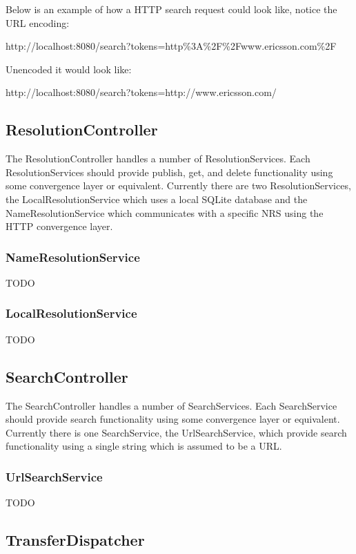Below is an example of how a HTTP search request could look like, notice the URL encoding:

http://localhost:8080/search?tokens=http\%3A\%2F\%2Fwww.ericsson.com\%2F

Unencoded it would look like:

http://localhost:8080/search?tokens=http://www.ericsson.com/

\subsection{ResolutionController}
\label{sec:ResolutionController}

The ResolutionController handles a number of ResolutionServices. Each ResolutionServices should provide publish, get, and delete functionality using some convergence layer or equivalent. Currently there are two ResolutionServices, the LocalResolutionService which uses a local SQLite database and the NameResolutionService which communicates with a specific NRS using the HTTP convergence layer.

\subsubsection{NameResolutionService}

TODO

\subsubsection{LocalResolutionService}

TODO

\subsection{SearchController}
\label{sec:SearchController}

The SearchController handles a number of SearchServices. Each SearchService should provide search functionality using some convergence layer or equivalent. Currently there is one SearchService, the UrlSearchService, which provide search functionality using a single string which is assumed to be a URL.

\subsubsection{UrlSearchService}

TODO

\subsection{TransferDispatcher}
\label{sec:TransferDispatcher}

